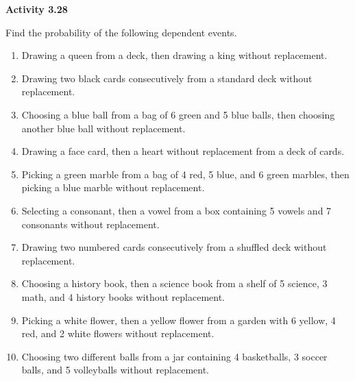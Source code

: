 \vspace{0.3ex}
\noindent\textbf{Activity 3.28}

\vspace{0.2ex}

Find the probability of the following dependent events.

\begin{enumerate}[label=\color{blue}\arabic*.]
    \item Drawing a queen from a deck, then drawing a king without replacement.
    \item Drawing two black cards consecutively from a standard deck without replacement.
    \item Choosing a blue ball from a bag of 6 green and 5 blue balls, then choosing another blue ball without replacement.
    \item Drawing a face card, then a heart without replacement from a deck of cards.
    \item Picking a green marble from a bag of 4 red, 5 blue, and 6 green marbles, then picking a blue marble without replacement.
    \item Selecting a consonant, then a vowel from a box containing 5 vowels and 7 consonants without replacement.
    \item Drawing two numbered cards consecutively from a shuffled deck without replacement.
    \item Choosing a history book, then a science book from a shelf of 5 science, 3 math, and 4 history books without replacement.
    \item Picking a white flower, then a yellow flower from a garden with 6 yellow, 4 red, and 2 white flowers without replacement.
    \item Choosing two different balls from a jar containing 4 basketballs, 3 soccer balls, and 5 volleyballs without replacement.
\end{enumerate}

